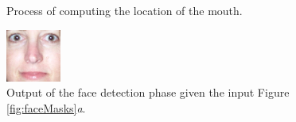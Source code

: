 \begin{figure}[H]
\caption{Process of computing the location of the mouth.}
\label{fig:mouthMap}
\end{figure}



\begin{figure}[H]
\centering
\includegraphics[width=0.16\textwidth]{img/fd2/output12.png}
\caption{Output of the face detection phase given the input Figure \ref{fig:faceMasks}\textit{a}.}
\label{fig:fdResult}
\end{figure}

